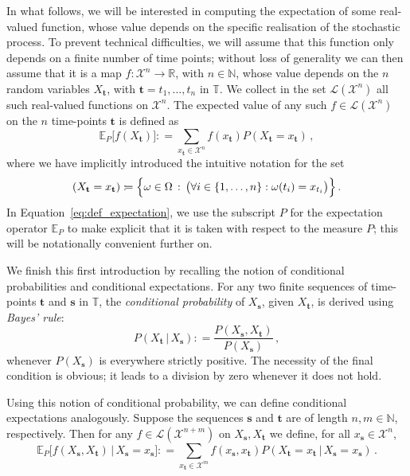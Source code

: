 \documentclass[graybox]{svmult}
\newcommand{\nats}{\mathbb{N}}
\newcommand{\reals}{\mathbb{R}}
\newcommand{\states}{\mathcal{X}}
\newcommand{\gambles}{\mathcal{L}}
\newcommand{\coloneqq}{:\!=}
\newcommand{\timedim}{\mathbb{T}}
\begin{document}
In what follows, we will be interested in computing the expectation of some real-valued function, whose value depends on the specific realisation of the stochastic process. To prevent technical difficulties, we will assume that this function only depends on a finite number of time points; without loss of generality we can then assume that it is a map $f:\states^n\to\reals$, with $n\in\nats$, whose value depends on the $n$ random variables $X_\mathbf{t}$, with $\mathbf{t}=t_1,\ldots,t_{n}$ in $\timedim$. We collect in the set $\gambles(\states^n)$ all such real-valued functions on $\states^n$. The expected value of any such $f\in\gambles(\states^n)$ on the $n$ time-points $\mathbf{t}$ is defined as
\begin{equation}\label{eq:def_expectation}
\mathbb{E}_P\bigr[f(X_\mathbf{t})\bigr] \coloneqq \sum_{x_\mathbf{t}\in\states^n}f(x_\mathbf{t}) P(X_\mathbf{t}=x_\mathbf{t})\,,
\end{equation}
where we have implicitly introduced the intuitive notation for the set
\begin{equation*}
(X_\mathbf{t}=x_\mathbf{t}) \coloneqq \Bigl\{\omega\in\Omega\,:\,\bigl(\forall i\in\{1,\ldots,n\}:\omega(t_i)=x_{t_i}\bigr)\Bigr\}\,.
\end{equation*}
In Equation~\eqref{eq:def_expectation}, we use the subscript $P$ for the expectation operator $\mathbb{E}_P$ to make explicit that it is taken with respect to the measure $P$; this will be notationally convenient further on.

We finish this first introduction by recalling the notion of conditional probabilities and conditional expectations. For any two finite sequences of time-points $\mathbf{t}$ and $\mathbf{s}$ in $\timedim$, the \emph{conditional probability} of $X_\mathbf{s}$, given $X_\mathbf{t}$, is derived using \emph{Bayes' rule}:
\begin{equation*}
P(X_\mathbf{t}\,\vert\,X_\mathbf{s}) \coloneqq \frac{P(X_\mathbf{s},X_\mathbf{t})}{P(X_\mathbf{s})}\,,
\end{equation*}
whenever $P(X_\mathbf{s})$ is everywhere strictly positive. The necessity of the final condition is obvious; it leads to a division by zero whenever it does not hold.

Using this notion of conditional probability, we can define conditional expectations analogously. Suppose the sequences $\mathbf{s}$ and $\mathbf{t}$ are of length $n,m\in\nats$, respectively. Then for any $f\in\gambles(\states^{n+m})$ on $X_\mathbf{s},X_\mathbf{t}$ we define, for all $x_\mathbf{s}\in\states^n$,
\begin{equation*}
\mathbb{E}_P\bigl[f(X_\mathbf{s},X_\mathbf{t})\,\big\vert\,X_\mathbf{s}=x_\mathbf{s}\bigr] \coloneqq \sum_{x_\mathbf{t}\in\states^m} f(x_\mathbf{s},x_\mathbf{t})P(X_\mathbf{t}=x_\mathbf{t}\,\vert\,X_\mathbf{s}=x_\mathbf{s})\,.
\end{equation*}
\end{document}
